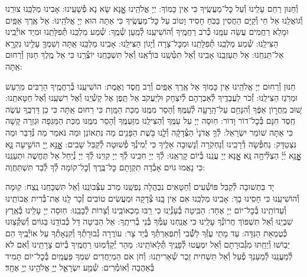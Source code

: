 \documentclass[twoside, openany, parskip=half, 11pt]{book}
\begin{document}
וְ֯חַנּוּן רַחֵם עָלֵֽינוּ וְ֯עַל כׇּל־מַעֲשֶֽׂיךָ כִּי אֵין כָּמֽוֹךָ: יְיָ אֱלֹהֵֽינוּ אׇׇׇׇנָּא שָׂא נָא פְ֯שָׁעֵֽינוּ: אָבִינוּ מַלְכֵּֽנוּ צוּרֵֽנוּ וְ֯גוֹאֲלֵֽנוּ אֵל חַי וְ֯קַיָּם הַחֲסִין בַּכֹּֽחַ חָסִיד וָטוֹב עַל כׇּל־מַעֲשֶֽׂיךָ כִּי אַתָּה הוּא יְיָ אֱלֹהֵֽינוּ: אֵל אֶֽרֶךְ אַפַּֽיִם וּמָלֵא רַחֲמִים עֲשֵׂה עִמָּֽנוּ כְּ֯רֹב רַחֲמֶֽיךָ וְ֯הוֹשִׁיעֵֽנוּ לְ֯מַֽעַן שְׁ֯מֶֽךָ: שְׁ֯מַע מַלְכֵּֽנוּ תְּ֯פִלָּתֵֽנוּ וּמִיַד אוֹיְ֯בֵֽינוּ הַצִּילֵֽנוּ: שְׁ֯מַע מַלְכֵּֽנוּ תְּ֯פִלָּתֵֽנוּ וּמִכׇּל־צָרָה וְ֯יָגוֹן הַצִּילֵֽנוּ: אָבִֽינוּ מַלְכֵּֽנוּ אַֽתָּה וְשִׁמְךָ֛ עָלֵ֥ינוּ נִקְרָ֖א אַל־תַּנִּחֵֽנוּ: אַל תַּעַזְבֵֽנוּ אָבִֽינוּ וְ֯אַל תִּטְּ֯שֵֽׁנוּ בּוֹרְ֯אֵֽנוּ וְ֯אַל תִּשְׁכָּחֵֽנוּ יוֹצְ֯רֵֽנוּ כִּי אֵל מֶֽלֶךְ חַנּוּן וְ֯רַחוּם אַֽתָּה:



חַנּוּן וְ֯רַחוּם יְיָ אֱלֹהֵֽינוּ אֵין כָּמֽוֹךָ אֵל אֶֽרֶךְ אַפַּֽיִם וְ֯רַב חֶֽסֶד וֶאֶמֶת: הוֹשִׁיעֵֽנוּ בְּ֯רַחֲמֶֽיךָ הָרַבִּים מֵרַֽעַשׁ וּמֵרֹֽגֶז הַצִּילֵֽנוּ: זְ֯כֹר לַעֲבָדֶֽיךָ לְ֯אַבְרָהָם לְ֯יִצְחָק וּלְיַעֲקֹב אַל תֵּֽפֶן אֶל קָשְׁ֯יֵֽנוּ וְ֯אֶל רִשְׁעֵֽנוּ וְ֯אֶל חַטָּאתֵֽנוּ:
שׁ֚וּב מֵֽחֲר֣וֹן אַפֶּ֔ךָ וְ֯הִנָּחֵ֥ם עַל־הָֽרָעָ֖ה לְ֯עַמֶּֽךָ׃ וְ֯הָסֵר מִמֶּֽנּוּ מַכַּת הַמָּֽוֶת כִּי רַחוּם אַֽתָּה כִּי כֵן דַּרְכֶּֽךָ עֹֽשֶׂה חֶֽסֶד חִנָּם בְּ֯כׇל־דוֹר וָדוֹר: חֽוּסָה יְיָ עַל עַמֶּֽךָ וְ֯הַצִּילֵֽנוּ מִזַּעְמֶּֽךָ וְ֯הָסֵר מִמֶּֽנּוּ מַכַּת הַמַּגֵּפָה וּגְזֵרָה קָשָׁה כִּי אַתָּה שׁוֹמֵר יִשְׂרָאֵל:
לְ֯ךָ֤ אֲדֹנָי֙ הַצְּ֯דָקָ֔ה וְ֯לָ֛נוּ בֹּ֥שֶׁת הַפָּנִ֖ים מַה נִּתְאוֹנֵן וּמַה נֹּאמַר מַה נְּ֯דַבֵּר וּמַה נִּצְטַדָּק: נַחְפְּ֯שָׂה דְ֯רָכֵֽינוּ וְ֯נַחְקֹֽרָה וְ֯נָשֽׁוּבָה אֵלֶֽיךָ כִּי יְ֯מִינְ֯ךָ פְ֯שׁוּטָה לְ֯קַבֵּל שָׁבִים:
אׇׇׇׇׇׇׇׇֽנָּ֣א יְ֖יָ הוֹשִׁ֣יעָה נָּ֑א אׇׇׇׇׇׇׇׇֽנָּ֥א יְ֜יָ֗ הַצְלִ֘יחָ֥ה נָּֽא׃ אׇׇׇׇנָּא יְיָ עֲנֵֽנוּ בְּ֯יוֹם קׇרְאֵֽנוּ: לְ֯ךָ יְיָ חִכִּֽינוּ לְ֯ךָ יְיָ קִוִּֽינוּ לְ֯ךָ יְיָ נְ֯יַחֵל אַל תֶּחֱשֶׁה וּתְעַנֵּֽנוּ כִּי נָאֲמוּ גוֹיִם אָבְ֯דָה תִקְוָתָם כׇּל־בֶּֽרֶךְ וְ֯כׇל־קוֹמָה לְ֯ךָ לְ֯בַד תִּשְׁתַּחֲוֶה:

יָד בִּתְשׁוּבָה לְ֯קַבֵּל פּוֹשְׁ֯עִים וְ֯חַטָּאִים נִבְהֲלָה נַפְשֵֽׁנוּ מֵרֹב עִצְּ֯בוֹנֵֽנוּ וְ֯אַל תִּשְׁכָּחֵֽנוּ נֶֽצַח: קֽוּמָה וְ֯הוֹשִׁיעֵֽנוּ כִּי חָסִֽינוּ בָךְ: אָבִֽינוּ מַלְכֵּֽנוּ אִם אֵין בָּֽנוּ צְ֯דָקָה וּמַעֲשִׂים טוֹבִים זְ֯כָר לָֽנוּ אֶת־בְּ֯רִית אֲבוֹתֵֽינוּ וְ֯עֵדוֹתֵֽינוּ בְּ֯כׇל־יוֹם יְיָ אֶחָד: הַבִּֽיטָה בְ֯עָנְ֯יֵֽנוּ כִּי רַֽבּוּ מַכְאוֹבֵֽינוּ וְ֯צָרוֹת לְ֯בָבֵֽנוּ: חֽוּסָה יְיָ עָלֵֽינוּ בְּ֯אֶֽרֶץ שִׁבְיֵֽנוּ וְ֯אַל תִּשְׁפּוֹךְ חֲרוֹנְ֯ךָ עָלֵֽינוּ כִּי אֲנַֽחְנוּ עַמְּ֯ךָ בְּ֯נֵי בְ֯רִיתֶֽךָ: אֵל הַבִּיטָה דַּל כְּ֯בוֹדֵֽנוּ בַּגּוֹיִם וְ֯שִׁקְּ֯צֽוּנוּ כְּ֯טֻמְאַת הַנִּדָּה: עַד מָתַי עֻזְּ֯ךָ לַשְּׁ֯֯בִי וְ֯תִפְאַרְתְּ֯ךָ בְּ֯יַד צָר: עוֹרֲרָה גְ֯בוּרָתְ֯ךָ וְ֯קִנְאָתְ֯ךָ עַל אוֹיְ֯בֶֽיךָ הֵם יֵבֽוֹשׁוּ וְ֯יֵחַֽתּוּ מִגְּ֯בוּרָתָם וְ֯אַל יִמְעֲטוּ לְ֯פָנֶֽיךָ תְּ֯לָאוֹתֵֽינוּ: מַהֵר יְ֯קַדְּ֯מֽוּנוּ רַחֲמֶֽיךָ בְּ֯יוֹם צָרָתֵֽינוּ וְ֯אִם לֹא לְ֯מַעֲנֵֽנוּ לְ֯מַעַנְךָ פְ֯עַל וְ֯אַל תַּשְׁחִית זֵֽכֶר שְׁ֯אֵרִיתֵֽנוּ: וְ֯חֹן אֹם הַמְיַחֲדִים שִׁמְךָ פַּעֲמַֽיִם בְּ֯כׇל־יוֹם תָּמִיד בְּ֯אַהֲבָה וְ֯אוֹמְ֯רִים:
שְׁ֯מַ֖ע יִשְׂרָאֵ֑ל יְיָ֥ אֱלֹהֵ֖ינוּ יְיָ֥ אֶחָֽד׃
\end{document}
